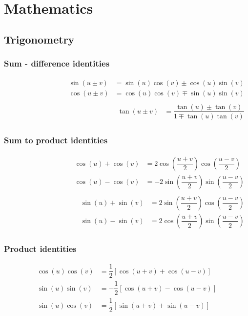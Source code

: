 \section{Mathematics}

\subsection{Trigonometry}
\subsubsection{Sum - difference identities}
\vspace{-0.6cm}
\begin{align*}
  \begin{split}
    \sin(u \pm v) &= \sin(u)\cos(v) \pm \cos(u)\sin(v) \\
    \cos(u \pm v) &= \cos(u)\cos(v) \mp \sin(u)\sin(v) \\
  \end{split}
  \begin{split}
    \tan(u \pm v) &= \dfrac{\tan(u) \pm \tan(v)}{1 \mp \tan(u) \tan(v)}
  \end{split}
\end{align*}

\subsubsection{Sum to product identities}
\vspace{-0.6cm}
\begin{align*}
  \begin{split}
    \cos(u) + \cos(v) &= 2\cos(\dfrac{u + v}{2}) \cos(\dfrac{u - v}{2}) \\
    \cos(u) - \cos(v) &= -2\sin(\dfrac{u + v}{2}) \sin(\dfrac{u - v}{2}) \\
  \end{split}
  \begin{split}
    \sin(u) + \sin(v) &= 2\sin(\dfrac{u + v}{2}) \cos(\dfrac{u - v}{2}) \\
    \sin(u) - \sin(v) &= 2\cos(\dfrac{u + v}{2}) \sin(\dfrac{u - v}{2})
  \end{split}
\end{align*}

\subsubsection{Product identities}
\vspace{-0.6cm}
\begin{align*}
  \cos(u)\cos(v) &= \dfrac{1}{2}[\cos(u + v) + \cos(u - v)] \\
  \sin(u)\sin(v) &= -\dfrac{1}{2}[\cos(u + v) - \cos(u - v)] \\
  \sin(u)\cos(v) &= \dfrac{1}{2}[\sin(u + v) + \sin(u - v)]
\end{align*}

